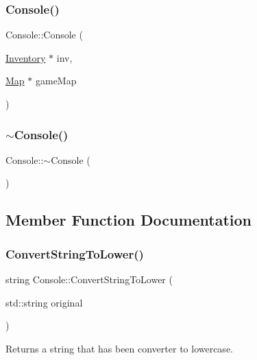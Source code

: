 \subsubsection{\texorpdfstring{Console()}{Console()}}
{\footnotesize\ttfamily Console\+::\+Console (\begin{DoxyParamCaption}\item[{\mbox{\hyperlink{class_inventory}{Inventory}} $\ast$}]{inv,  }\item[{\mbox{\hyperlink{class_map}{Map}} $\ast$}]{game\+Map }\end{DoxyParamCaption})}

\mbox{\label{class_console_a32e8c79c8579b1b076e53848c540d4e7}} 
\subsubsection{\texorpdfstring{$\sim$\+Console()}{~Console()}}
{\footnotesize\ttfamily Console\+::$\sim$\+Console (\begin{DoxyParamCaption}{ }\end{DoxyParamCaption})\hspace{0.3cm}{\ttfamily [virtual]}}



\subsection{Member Function Documentation}
\mbox{\label{class_console_aee315491a0fcd06f3c27fdea7810191c}} 
\subsubsection{\texorpdfstring{Convert\+String\+To\+Lower()}{ConvertStringToLower()}}
{\footnotesize\ttfamily string Console\+::\+Convert\+String\+To\+Lower (\begin{DoxyParamCaption}\item[{std\+::string}]{original }\end{DoxyParamCaption})}



Returns a string that has been converter to lowercase. 


